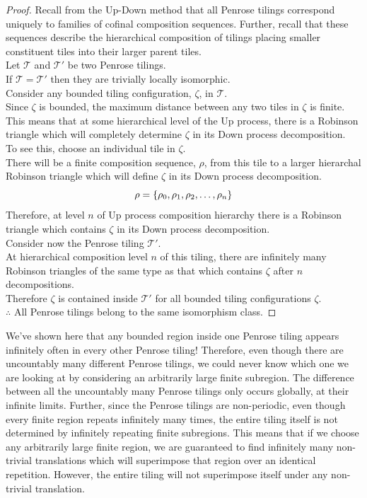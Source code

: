 \documentclass[
  oneside,
  11pt, a4paper,
  footinclude=true,
  headinclude=true,
  cleardoublepage=empty
]{scrbook}
\begin{document}
 \begin{proof}
 Recall from the Up-Down method that all Penrose tilings correspond uniquely to families of cofinal composition sequences. Further, recall that these sequences describe the hierarchical composition of tilings placing smaller constituent tiles into their larger parent tiles.\\
 Let $\mathcal{T}$ and $\mathcal{T}'$ be two Penrose tilings.\\
 If $\mathcal{T} = \mathcal{T}'$ then they are trivially locally isomorphic.\\
 Consider any bounded tiling configuration, $\zeta$, in $\mathcal{T}$.\\
 Since $\zeta$ is bounded, the maximum distance between any two tiles in $\zeta$ is finite.\\
 This means that at some hierarchical level of the Up process, there is a Robinson triangle which will completely determine $\zeta$ in its Down process decomposition.\\
 To see this, choose an individual tile in $\zeta$.\\
 There will be a finite composition sequence, $\rho$, from this tile to a larger hierarchal Robinson triangle which will define $\zeta$ in its Down process decomposition.\\
 \begin{equation*}
 \rho = \{\rho_0, \rho_1, \rho_2,\mathellipsis,\rho_n\}
 \end{equation*}
 Therefore, at level $n$ of Up process composition hierarchy there is a Robinson triangle which contains $\zeta$ in its Down process decomposition.\\
 Consider now the Penrose tiling $\mathcal{T}'$.\\
 At hierarchical composition level $n$ of this tiling, there are infinitely many Robinson triangles of the same type as that which contains $\zeta$ after $n$ decompositions.\\
 Therefore $\zeta$ is contained inside $\mathcal{T}'$ for all bounded tiling configurations $\zeta$.\\
 $\therefore$ All Penrose tilings belong to the same isomorphism class. 
 \end{proof}
 
 We've shown here that any bounded region inside one Penrose tiling appears infinitely often in every other Penrose tiling! Therefore, even though there are uncountably many different Penrose tilings, we could never know which one we are looking at by considering an arbitrarily large finite subregion. The difference between all the uncountably many Penrose tilings only occurs globally, at their infinite limits. Further, since the Penrose tilings are non-periodic, even though every finite region repeats infinitely many times, the entire tiling itself is not determined by infinitely repeating finite subregions. This means that if we choose any arbitrarily large finite region, we are guaranteed to find infinitely many non-trivial translations which will superimpose that region over an identical repetition. However, the entire tiling will not superimpose itself under any non-trivial translation.
 
\end{document}
